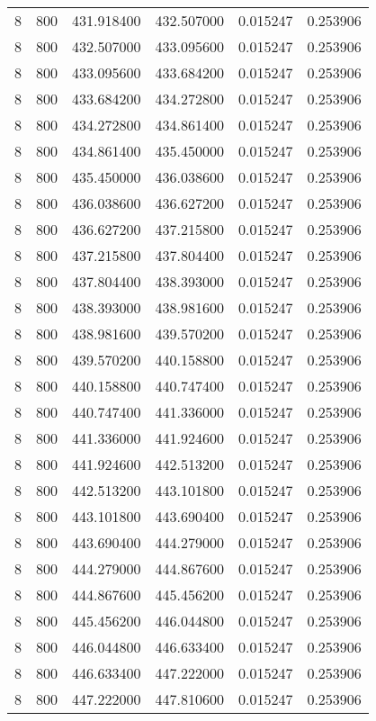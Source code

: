 \begin{longtable}{rrrrrr}
8 & 800 & 431.918400 & 432.507000 & 0.015247 & 0.253906 \\
8 & 800 & 432.507000 & 433.095600 & 0.015247 & 0.253906 \\
8 & 800 & 433.095600 & 433.684200 & 0.015247 & 0.253906 \\
8 & 800 & 433.684200 & 434.272800 & 0.015247 & 0.253906 \\
8 & 800 & 434.272800 & 434.861400 & 0.015247 & 0.253906 \\
8 & 800 & 434.861400 & 435.450000 & 0.015247 & 0.253906 \\
8 & 800 & 435.450000 & 436.038600 & 0.015247 & 0.253906 \\
8 & 800 & 436.038600 & 436.627200 & 0.015247 & 0.253906 \\
8 & 800 & 436.627200 & 437.215800 & 0.015247 & 0.253906 \\
8 & 800 & 437.215800 & 437.804400 & 0.015247 & 0.253906 \\
8 & 800 & 437.804400 & 438.393000 & 0.015247 & 0.253906 \\
8 & 800 & 438.393000 & 438.981600 & 0.015247 & 0.253906 \\
8 & 800 & 438.981600 & 439.570200 & 0.015247 & 0.253906 \\
8 & 800 & 439.570200 & 440.158800 & 0.015247 & 0.253906 \\
8 & 800 & 440.158800 & 440.747400 & 0.015247 & 0.253906 \\
8 & 800 & 440.747400 & 441.336000 & 0.015247 & 0.253906 \\
8 & 800 & 441.336000 & 441.924600 & 0.015247 & 0.253906 \\
8 & 800 & 441.924600 & 442.513200 & 0.015247 & 0.253906 \\
8 & 800 & 442.513200 & 443.101800 & 0.015247 & 0.253906 \\
8 & 800 & 443.101800 & 443.690400 & 0.015247 & 0.253906 \\
8 & 800 & 443.690400 & 444.279000 & 0.015247 & 0.253906 \\
8 & 800 & 444.279000 & 444.867600 & 0.015247 & 0.253906 \\
8 & 800 & 444.867600 & 445.456200 & 0.015247 & 0.253906 \\
8 & 800 & 445.456200 & 446.044800 & 0.015247 & 0.253906 \\
8 & 800 & 446.044800 & 446.633400 & 0.015247 & 0.253906 \\
8 & 800 & 446.633400 & 447.222000 & 0.015247 & 0.253906 \\
8 & 800 & 447.222000 & 447.810600 & 0.015247 & 0.253906 \\

\end{longtable}
